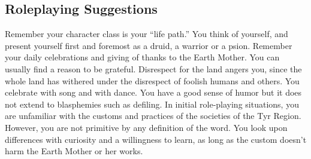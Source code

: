 \subsection{Roleplaying Suggestions}
Remember your character class is your ``life path.'' You think of yourself, and present yourself first and foremost as a druid, a warrior or a psion. Remember your daily celebrations and giving of thanks to the Earth Mother. You can usually find a reason to be grateful. Disrespect for the land angers you, since the whole land has withered under the disrespect of foolish humans and others. You celebrate with song and with dance. You have a good sense of humor but it does not extend to blasphemies such as defiling. In initial role-playing situations, you are unfamiliar with the customs and practices of the societies of the Tyr Region. However, you are not primitive by any definition of the word. You look upon differences with curiosity and a willingness to learn, as long as the custom doesn't harm the Earth Mother or her works.

